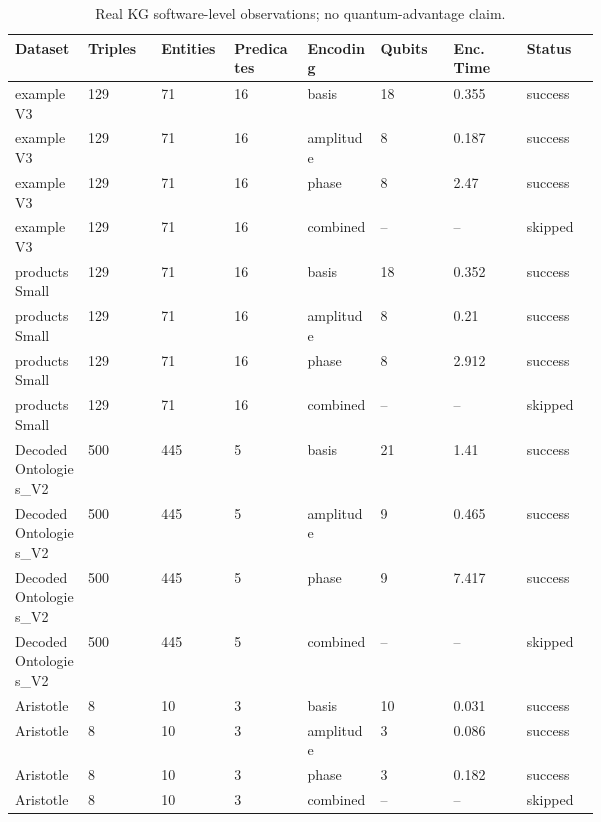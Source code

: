 \begin{table}[t]
\centering
\scriptsize
\setlength{\tabcolsep}{2pt}
\renewcommand{\arraystretch}{1.08}
\caption{Real KG software-level observations; no quantum-advantage claim.}
\label{tab:chapter9-real-kg-observations}
\begin{tabular}{@{}p{0.085\linewidth}p{0.085\linewidth}p{0.085\linewidth}p{0.085\linewidth}p{0.085\linewidth}p{0.085\linewidth}p{0.085\linewidth}p{0.085\linewidth}@{}}
\hline
Dataset & Triples & Entities & Predicates & Encoding & Qubits & Enc. Time & Status \\
\hline
exampleV3 & 129 & 71 & 16 & basis & 18 & 0.355 & success \\
exampleV3 & 129 & 71 & 16 & amplitude & 8 & 0.187 & success \\
exampleV3 & 129 & 71 & 16 & phase & 8 & 2.47 & success \\
exampleV3 & 129 & 71 & 16 & combined & -- & -- & skipped \\
productsSmall & 129 & 71 & 16 & basis & 18 & 0.352 & success \\
productsSmall & 129 & 71 & 16 & amplitude & 8 & 0.21 & success \\
productsSmall & 129 & 71 & 16 & phase & 8 & 2.912 & success \\
productsSmall & 129 & 71 & 16 & combined & -- & -- & skipped \\
DecodedOntologies\_V2 & 500 & 445 & 5 & basis & 21 & 1.41 & success \\
DecodedOntologies\_V2 & 500 & 445 & 5 & amplitude & 9 & 0.465 & success \\
DecodedOntologies\_V2 & 500 & 445 & 5 & phase & 9 & 7.417 & success \\
DecodedOntologies\_V2 & 500 & 445 & 5 & combined & -- & -- & skipped \\
Aristotle & 8 & 10 & 3 & basis & 10 & 0.031 & success \\
Aristotle & 8 & 10 & 3 & amplitude & 3 & 0.086 & success \\
Aristotle & 8 & 10 & 3 & phase & 3 & 0.182 & success \\
Aristotle & 8 & 10 & 3 & combined & -- & -- & skipped \\
\hline
\end{tabular}
\end{table}
